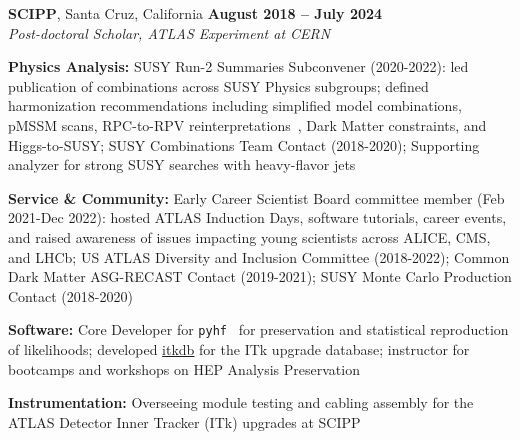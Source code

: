 \documentclass[margin,line]{resume}
\begin{document}
\begin{resume}
\textbf{SCIPP}, Santa Cruz, California \hfill \textbf{August 2018 -- July 2024}\\
\textsl{Post-doctoral Scholar, ATLAS Experiment at CERN}
\begin{list2}
  \item \textbf{Physics Analysis:} SUSY Run-2 Summaries Subconvener (2020-2022): led publication of combinations across SUSY Physics subgroups; defined harmonization recommendations including simplified model combinations, pMSSM scans, RPC-to-RPV reinterpretations~\cite{ATLAS:2026mla}, Dark Matter constraints, and Higgs-to-SUSY; SUSY Combinations Team Contact (2018-2020); Supporting analyzer for strong SUSY searches with heavy-flavor jets~\cite{SUSY-2016-10, SUSY-2015-10, ATLAS-CONF-2017-021, ATLAS-CONF-2016-052, ATLAS-CONF-2015-067}
  \item \textbf{Service \& Community:} Early Career Scientist Board committee member (Feb 2021-Dec 2022): hosted ATLAS Induction Days, software tutorials, career events, and raised awareness of issues impacting young scientists across ALICE, CMS, and LHCb; US ATLAS Diversity and Inclusion Committee (2018-2022); Common Dark Matter ASG-RECAST Contact (2019-2021); SUSY Monte Carlo Production Contact (2018-2020)
  \item \textbf{Software:} Core Developer for \texttt{pyhf}~\cite{ATL-PHYS-PUB-2019-029} for preservation and statistical reproduction of likelihoods; developed \href{https://pypi.org/project/itkdb/}{itkdb} for the ITk upgrade database; instructor for bootcamps and workshops on HEP Analysis Preservation~\cite{AwesomeFeb2020,USATLASBootcamp2019}
  \item \textbf{Instrumentation:} Overseeing module testing and cabling assembly for the ATLAS Detector Inner Tracker (ITk) upgrades at SCIPP
\end{list2}


\end{resume}
\end{document}

